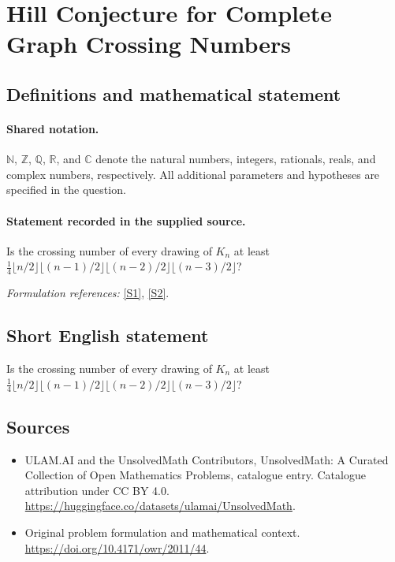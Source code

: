\documentclass[11pt]{article}
\newcommand{\sref}[2]{\hyperlink{source:#1:#2}{[S#2]}}
\begin{document}
\section{Hill Conjecture for Complete Graph Crossing Numbers}\label{statement}

\subsection{Definitions and mathematical statement}

\paragraph{Shared notation.}$\mathbb N$, $\mathbb Z$, $\mathbb Q$, $\mathbb R$, and $\mathbb C$ denote the natural numbers, integers, rationals, reals, and complex numbers, respectively. All additional parameters and hypotheses are specified in the question.


\paragraph{Statement recorded in the supplied source.}
Is the crossing number of every drawing of $K_n$ at least $\frac14\lfloor n/2\rfloor\lfloor(n-1)/2\rfloor\lfloor(n-2)/2\rfloor\lfloor(n-3)/2\rfloor$?
\par\smallskip\textit{Formulation references:} \sref{statement}{1}, \sref{statement}{2}.
\subsection{Short English statement}
Is the crossing number of every drawing of $K_n$ at least $\frac14\lfloor n/2\rfloor\lfloor(n-1)/2\rfloor\lfloor(n-2)/2\rfloor\lfloor(n-3)/2\rfloor$?
\subsection{Sources}
\begin{itemize}
\item[\hypertarget{source:statement:1}{S1}] ULAM.AI and the UnsolvedMath Contributors, UnsolvedMath: A Curated Collection of Open Mathematics Problems, catalogue entry. Catalogue attribution under CC BY 4.0.
\url{https://huggingface.co/datasets/ulamai/UnsolvedMath}.
\item[\hypertarget{source:statement:2}{S2}] Original problem formulation and mathematical context.
\url{https://doi.org/10.4171/owr/2011/44}.
\end{itemize}
\label{end:statement}
\end{document}
